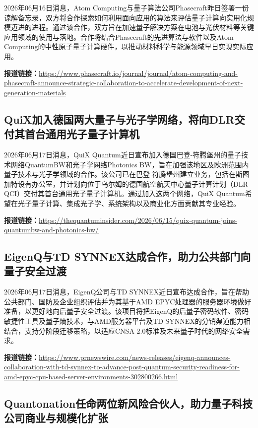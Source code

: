 \documentclass[12pt,a4paper]{ctexart}
\begin{document}
2026年06月16日消息，Atom Computing与量子算法公司Phasecraft昨日签署一份谅解备忘录，双方将合作探索如何利用面向应用的算法来评估量子计算向实用化规模迈进的进程。通过该合作，双方旨在加速量子解决方案在电池与光伏材料等关键应用领域的使用与落地。合作将结合Phasecraft的先进算法与软件以及Atom Computing的中性原子量子计算硬件，以推动材料科学与能源领域早日实现实际应用。

\noindent\textbf{报道链接：}\url{https://www.phasecraft.io/journal/journal/atom-computing-and-phasecraft-announce-strategic-collaboration-to-accelerate-development-of-next-generation-materials}

\subsection{ QuiX加入德国两大量子与光子学网络，将向DLR交付其首台通用光子量子计算机 }

2026年06月17日消息，QuiX Quantum近日宣布加入德国巴登-符腾堡州的量子技术网络QuantumBW和光子学网络Photonics BW，旨在加强该地区及欧洲范围内量子技术与光子学领域的合作。该公司已在巴登-符腾堡州建立业务，包括在斯图加特设有办公室，并计划向位于乌尔姆的德国航空航天中心量子计算计划（DLR QCI）交付其首台通用光子量子计算机。通过加入这两个网络，QuiX Quantum希望在光子量子计算、集成光子学、系统架构以及商业化方面贡献其专业经验。

\noindent\textbf{报道链接：}\url{https://thequantuminsider.com/2026/06/15/quix-quantum-joins-quantumbw-and-photonics-bw/}

\subsection{ EigenQ与TD SYNNEX达成合作，助力公共部门向量子安全过渡 }

2026年06月17日消息，EigenQ公司与TD SYNNEX近日宣布达成合作，旨在帮助公共部门、国防及企业组织评估并为其基于AMD EPYC处理器的服务器环境做好准备，以更好地向后量子安全过渡。该项目将把EigenQ的后量子密码软件、密码敏捷性工具及量子熵技术，与AMD服务器平台及TD SYNNEX的分销渠道能力相结合，支持分阶段迁移策略，以适应CNSA 2.0标准及未来量子时代的网络安全需求。

\noindent\textbf{报道链接：}\url{https://www.prnewswire.com/news-releases/eigenq-announces-collaboration-with-td-synnex-to-advance-post-quantum-security-readiness-for-amd-epyc-cpu-based-server-environments-302800266.html}

\subsection{ Quantonation任命两位新风险合伙人，助力量子科技公司商业与规模化扩张 }
\end{document}
